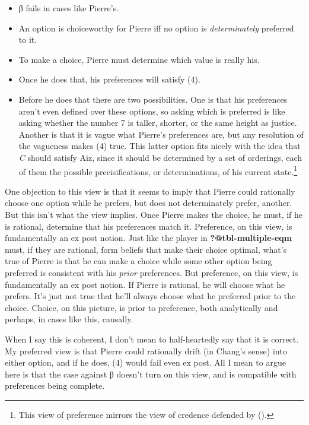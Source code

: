\documentclass[
  11pt,
  letterpaper,
  DIV=11,
  numbers=noendperiod,
  twoside]{scrartcl}
\providecommand{\tightlist}{%
  \setlength{\itemsep}{0pt}\setlength{\parskip}{0pt}}
\begin{document}
\begin{itemize}
\tightlist
\item
  β fails in cases like Pierre's.
\item
  An option is choiceworthy for Pierre iff no option is
  \emph{determinately} preferred to it.
\item
  To make a choice, Pierre must determine which value is really his.
\item
  Once he does that, his preferences will satisfy (4).
\item
  Before he does that there are two possibilities. One is that his
  preferences aren't even defined over these options, so asking which is
  preferred is like asking whether the number 7 is taller, shorter, or
  the same height as justice. Another is that it is vague what Pierre's
  preferences are, but any resolution of the vagueness makes (4) true.
  This latter option fits nicely with the idea that \emph{C} should
  satisfy Aiz, since it should be determined by a set of orderings, each
  of them the possible precisifications, or determinations, of his
  current state.\footnote{This view of preference mirrors the view of
    credence defended by ().}
\end{itemize}

One objection to this view is that it seems to imply that Pierre could
rationally choose one option while he prefers, but does not
determinately prefer, another. But this isn't what the view implies.
Once Pierre makes the choice, he must, if he is rational, determine that
his preferences match it. Preference, on this view, is fundamentally an
ex post notion. Just like the player in \textbf{?@tbl-multiple-eqm}
must, if they are rational, form beliefs that make their choice optimal,
what's true of Pierre is that he can make a choice while some other
option being preferred is consistent with his \emph{prior} preferences.
But preference, on this view, is fundamentally an ex post notion. If
Pierre is rational, he will choose what he prefers. It's just not true
that he'll always choose what he preferred prior to the choice. Choice,
on this picture, is prior to preference, both analytically and perhaps,
in cases like this, causally.

When I say this is coherent, I don't mean to half-heartedly say that it
is correct. My preferred view is that Pierre could rationally drift (in
Chang's sense) into either option, and if he does, (4) would fail even
ex post. All I mean to argue here is that the case against β doesn't
turn on this view, and is compatible with preferences being complete.
\end{document}
